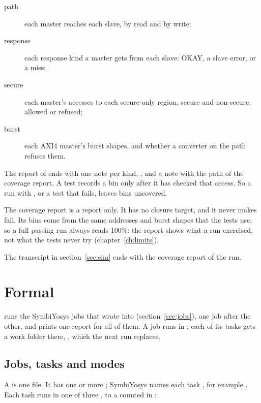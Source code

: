 \begin{description}
\item[path] each master reaches each slave, by read and by write;
\item[response] each response kind a master gets from each slave: OKAY, a slave error, or
  a miss;
\item[secure] each master's accesses to each secure-only region, secure and non-secure,
  allowed or refused;
\item[burst] each AXI4 master's burst shapes, and whether a converter on the path
  refuses them.
\end{description}

The report of  ends with one note per kind, ,
and a note with the path of the coverage report. A test records a bin only after it has checked that
access. So a run with , or a test that fails, leaves bins uncovered.

The coverage report is a report only. It has no closure target, and it never makes
 fail. Its bins come from the same addresses and burst shapes that the
tests use, so a full passing run always reads 100\%: the report shows what a run
exercised, not what the tests never try (chapter~\ref{ch:limits}).

The transcript in section~\ref{sec:sim} ends with the coverage report of the
 run.

\section{Formal}
\label{sec:formal}

 runs the SymbiYosys jobs that  wrote into
 (section~\ref{sec:jobs}), one job after the other, and prints one report
for all of them. A job runs in ; each of its tasks gets a work folder there,
, which the next run replaces.

\subsection{Jobs, tasks and modes}

A  is one  file. It has one or more ; SymbiYosys names
each task , for example . Each task runs in
one of three , to a  counted in :

